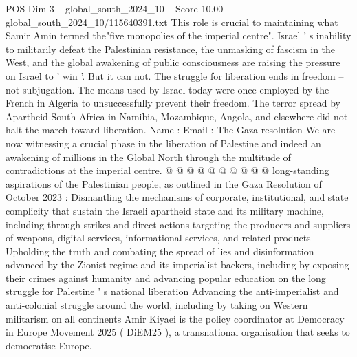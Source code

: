 \begin{textsample}{POS Dim 3 – global\_south\_2024\_10 – Score 10.00 – global\_south\_2024\_10/115640391.txt}
This role is crucial to maintaining what Samir Amin termed the"five monopolies of the imperial centre".
Israel ' s inability to militarily defeat the Palestinian resistance, the unmasking of fascism in the West, and the global awakening of public consciousness are raising the pressure on Israel to ' win '.
But it can not.
The struggle for liberation ends in freedom -- not subjugation.
The means used by Israel today were once employed by the French in Algeria to unsuccessfully prevent their freedom.
The terror spread by Apartheid South Africa in Namibia, Mozambique, Angola, and elsewhere did not halt the march toward liberation.
Name : Email : The Gaza resolution We are now witnessing a crucial phase in the liberation of Palestine and indeed an awakening of millions in the Global North through the multitude of contradictions at the imperial centre. @ @ @ @ @ @ @ @ @ @ long-standing aspirations of the Palestinian people, as outlined in the Gaza Resolution of October 2023 : Dismantling the mechanisms of corporate, institutional, and state complicity that sustain the Israeli apartheid state and its military machine, including through strikes and direct actions targeting the producers and suppliers of weapons, digital services, informational services, and related products Upholding the truth and combating the spread of lies and disinformation advanced by the Zionist regime and its imperialist backers, including by exposing their crimes against humanity and advancing popular education on the long struggle for Palestine ' s national liberation Advancing the anti-imperialist and anti-colonial struggle around the world, including by taking on Western militarism on all continents Amir Kiyaei is the policy coordinator at Democracy in Europe Movement 2025 ( DiEM25 ), a transnational organisation that seeks to democratise Europe.

\end{textsample}
